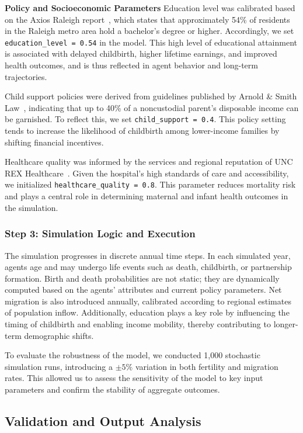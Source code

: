 \documentclass[12pt]{article}
\begin{document}
\textbf{Policy and Socioeconomic Parameters}
Education level was calibrated based on the Axios Raleigh report~\cite{axios}, which states that approximately 54\% of residents in the Raleigh metro area hold a bachelor’s degree or higher. Accordingly, we set \texttt{education\_level = 0.54} in the model. This high level of educational attainment is associated with delayed childbirth, higher lifetime earnings, and improved health outcomes, and is thus reflected in agent behavior and long-term trajectories.

Child support policies were derived from guidelines published by Arnold \& Smith Law~\cite{arnoldsmith}, indicating that up to 40\% of a noncustodial parent’s disposable income can be garnished. To reflect this, we set \texttt{child\_support = 0.4}. This policy setting tends to increase the likelihood of childbirth among lower-income families by shifting financial incentives.

Healthcare quality was informed by the services and regional reputation of UNC REX Healthcare~\cite{rex}. Given the hospital’s high standards of care and accessibility, we initialized \texttt{healthcare\_quality = 0.8}. This parameter reduces mortality risk and plays a central role in determining maternal and infant health outcomes in the simulation.

\subsubsection*{Step 3: Simulation Logic and Execution}

The simulation progresses in discrete annual time steps. In each simulated year, agents age and may undergo life events such as death, childbirth, or partnership formation. Birth and death probabilities are not static; they are dynamically computed based on the agents’ attributes and current policy parameters. Net migration is also introduced annually, calibrated according to regional estimates of population inflow. Additionally, education plays a key role by influencing the timing of childbirth and enabling income mobility, thereby contributing to longer-term demographic shifts.

To evaluate the robustness of the model, we conducted 1,000 stochastic simulation runs, introducing a $\pm5\%$ variation in both fertility and migration rates. This allowed us to assess the sensitivity of the model to key input parameters and confirm the stability of aggregate outcomes.

\subsection{Validation and Output Analysis}
\end{document}
